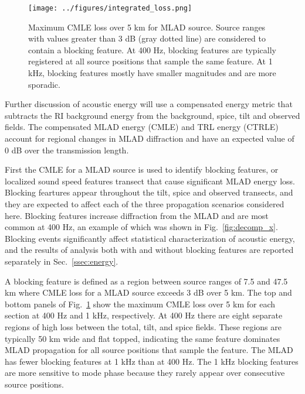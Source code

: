 \documentclass[preprint,NumberedRefs]{JASA}
\begin{document}
\begin{figure}
\texttt{[image: ../figures/integrated\_loss.png]}
    \caption{Maximum CMLE loss over 5 km for MLAD source. Source ranges with values greater than 3 dB (gray dotted line) are considered to contain a blocking feature. At 400 Hz, blocking features are typically registered at all source positions that sample the same feature. At 1 kHz, blocking features mostly have smaller magnitudes and are more sporadic.}
    \label{fig:blocking}
\end{figure}
Further discussion of acoustic energy will use a compensated energy metric that subtracts the RI background energy from the background, spice, tilt and observed fields. The compensated MLAD energy (CMLE) and TRL energy (CTRLE) account for regional changes in MLAD diffraction and have an expected value of 0 dB over the transmission length.

First the CMLE for a MLAD source is used to identify blocking features, or localized sound speed features transect that cause significant MLAD energy loss. Blocking feartures appear throughout the tilt, spice and observed transects, and they are expected to affect each of the three propagation scenarios considered here. Blocking features increase diffraction from the MLAD and are most common at 400 Hz, an example of which was shown in Fig.~\ref{fig:decomp_x}. Blocking events significantly affect statistical characterization of acoustic energy, and the results of analysis both with and without blocking features are reported separately in Sec.~\ref{ssec:energy}.

A blocking feature is defined as a region between source ranges of 7.5 and 47.5 km where CMLE loss for a MLAD source exceeds 3 dB over 5 km. The top and bottom panels of Fig.~\ref{fig:blocking} show the maximum CMLE loss over 5 km for each section at 400 Hz and 1 kHz, respectively. At 400 Hz there are eight separate regions of high loss between the total, tilt, and spice fields. These regions are typically 50 km wide and flat topped, indicating the same feature dominates MLAD propagation for all source positions that sample the feature. The MLAD has fewer blocking features at 1 kHz than at 400 Hz. The 1 kHz blocking features are more sensitive to mode phase because they rarely appear over consecutive source positions.
\end{document}
